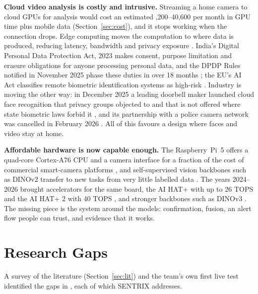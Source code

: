 \textbf{Cloud video analysis is costly and intrusive.} Streaming a home camera to cloud GPUs for analysis would cost an estimated ,200--40,600 per month in GPU time plus mobile data (Section~\ref{sec:cost}), and it stops working when the connection drops. Edge computing moves the computation to where data is produced, reducing latency, bandwidth and privacy exposure \cite{shi2016edge}. India's Digital Personal Data Protection Act, 2023 \cite{dpdp2023} makes consent, purpose limitation and erasure obligations for anyone processing personal data, and the DPDP Rules notified in November 2025 phase these duties in over 18 months \cite{pib2025dpdp}; the EU's AI Act classifies remote biometric identification systems as high-risk \cite{eu2024aiact}. Industry is moving the other way: in December 2025 a leading doorbell maker launched cloud face recognition that privacy groups objected to and that is not offered where state biometric laws forbid it \cite{perez2025ringfaces}, and its partnership with a police camera network was cancelled in February 2026 \cite{silberling2026ringflock}. All of this favours a design where faces and video stay at home.

\textbf{Affordable hardware is now capable enough.} The Raspberry~Pi~5 offers a quad-core Cortex-A76 CPU and a camera interface for a fraction of the cost of commercial smart-camera platforms \cite{rpi5brief}, and self-supervised vision backbones such as DINOv2 transfer to new tasks from very little labelled data \cite{oquab2024dinov2}. The years 2024--2026 brought accelerators for the same board, the AI HAT+ with up to 26 TOPS \cite{rpi2024aihat} and the AI HAT+ 2 with 40 TOPS \cite{rpi2026aihat2}, and stronger backbones such as DINOv3 \cite{simeoni2025dinov3}. The missing piece is the system around the models: confirmation, fusion, an alert flow people can trust, and evidence that it works.

\section{Research Gaps}
\label{sec:gaps}
A survey of the literature (Section~\ref{sec:lit}) and the team's own first live test identified the gaps in , each of which SENTRIX addresses.

